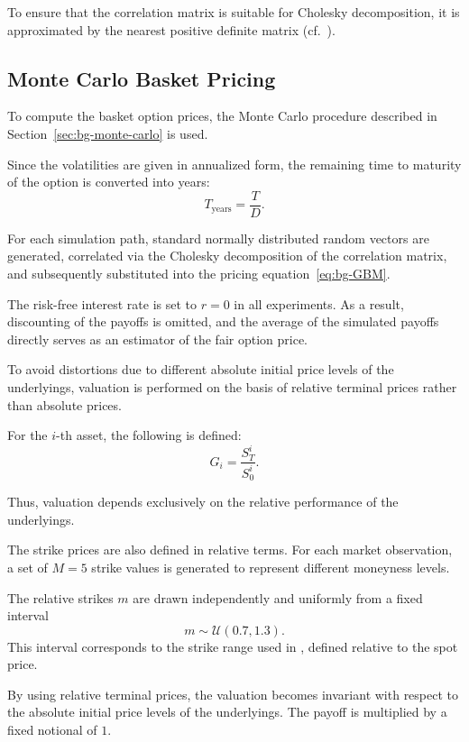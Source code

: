 To ensure that the correlation matrix is suitable for Cholesky decomposition, it is approximated by the nearest positive definite matrix (cf.~\cite{higham1988computing}).

\subsection{Monte Carlo Basket Pricing}
\label{sec:mt-monte-Carol}

To compute the basket option prices, the Monte Carlo procedure described in Section~\ref{sec:bg-monte-carlo} is used.

Since the volatilities are given in annualized form, the remaining time to maturity of the option is converted into years:
\begin{equation}
T_{\text{years}} = \frac{T}{D}.
\end{equation}

For each simulation path, standard normally distributed random vectors are generated, correlated via the Cholesky decomposition of the correlation matrix, and subsequently substituted into the pricing equation~\eqref{eq:bg-GBM}.

The risk-free interest rate is set to $r = 0$ in all experiments. As a result, discounting of the payoffs is omitted, and the average of the simulated payoffs directly serves as an estimator of the fair option price.

To avoid distortions due to different absolute initial price levels of the underlyings, valuation is performed on the basis of relative terminal prices rather than absolute prices.

For the $i$-th asset, the following is defined:
\begin{equation}
G_i = \frac{S_T^{i}}{S_0^{i}}.
\end{equation}

Thus, valuation depends exclusively on the relative performance of the underlyings.

The strike prices are also defined in relative terms.
For each market observation, a set of $M = 5$ strike values is generated
to represent different moneyness levels.

The relative strikes $m$ are drawn independently and uniformly
from a fixed interval
\[
m \sim \mathcal{U}(0.7, 1.3).
\]
This interval corresponds to the strike range used in
\cite{culkin2017machine}, defined relative to the spot price.

By using relative terminal prices, the valuation becomes invariant with respect to the absolute initial price levels of the underlyings. The payoff is multiplied by a fixed notional of $1$.

